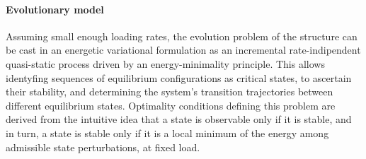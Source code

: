 







\paragraph{Evolutionary model}
\label{sec:stability}

Assuming small enough loading rates, 
the evolution problem of the structure can be cast in an energetic variational formulation as an incremental rate-indipendent quasi-static process driven by an energy-minimality principle.
This allows identyfing sequences of equilibrium configurations as critical states, to ascertain their stability, and determining the system's transition trajectories between different equilibrium states.
Optimality conditions defining this problem are derived from the
intuitive idea that a state is observable only if it is stable, and in turn, a state is stable only if it is a local minimum of the energy among admissible state perturbations, at fixed load. 

